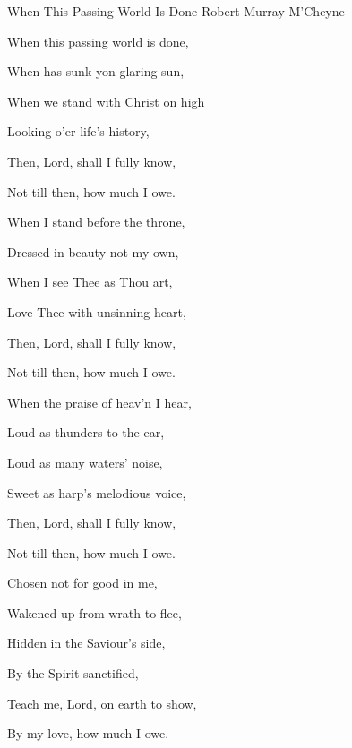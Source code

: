 \documentclass[12pt]{book}
\begin{document}
\begin{song}{When This Passing World Is Done}{}
  {\SBPubDom}
  {Robert Murray M'Cheyne}
  {}
  {}

  \begin{SBVerse}
    When this passing world is done,

    When has sunk yon glaring sun,

    When we stand with Christ on high

    Looking o'er life's history,

    Then, Lord, shall I fully know,

    Not till then, how much I owe.
  \end{SBVerse}

  \begin{SBVerse}
    When I stand before the throne,

    Dressed in beauty not my own,

    When I see Thee as Thou art,

    Love Thee with unsinning heart,

    Then, Lord, shall I fully know,

    Not till then, how much I owe.
  \end{SBVerse}

  \begin{SBVerse}
    When the praise of heav'n I hear,

    Loud as thunders to the ear,

    Loud as many waters' noise,

    Sweet as harp's melodious voice,

    Then, Lord, shall I fully know,

    Not till then, how much I owe.
  \end{SBVerse}

  \begin{SBVerse}
    Chosen not for good in me,

    Wakened up from wrath to flee,

    Hidden in the Saviour's side,

    By the Spirit sanctified,

    Teach me, Lord, on earth to show,

    By my love, how much I owe.
  \end{SBVerse}

\end{song}
\end{document}
